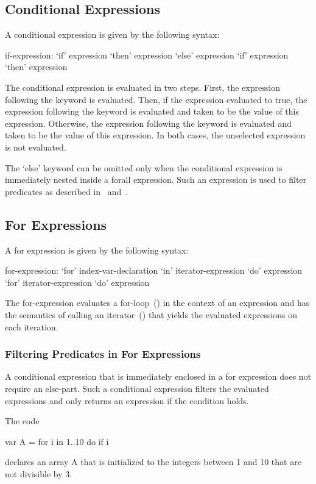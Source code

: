 \subsection{Conditional Expressions}
\label{Conditional_Expressions}

A conditional expression is given by the following syntax:
\begin{syntax}
if-expression:
  `if' expression `then' expression `else' expression
  `if' expression `then' expression
\end{syntax}
The conditional expression is evaluated in two steps.  First, the
expression following the  keyword is evaluated.  Then, if the
expression evaluated to true, the expression following the 
keyword is evaluated and taken to be the value of this expression.
Otherwise, the expression following the  keyword is
evaluated and taken to be the value of this expression.  In both
cases, the unselected expression is not evaluated.

The `else' keyword can be omitted only when the conditional expression
is immediately nested inside a forall expression.  Such an expression
is used to filter predicates as described
in~ and~.

\subsection{For Expressions}
\label{For_Expressions}

A for expression is given by the following syntax:
\begin{syntax}
for-expression:
  `for' index-var-declaration `in' iterator-expression `do' expression
  `for' iterator-expression `do' expression
\end{syntax}
The for-expression evaluates a for-loop~() in the
context of an expression and has the semantics of calling an
iterator~() that yields the evaluated expressions on
each iteration.

\subsubsection{Filtering Predicates in For Expressions}
\label{Filtering_Predicates_For}

A conditional expression that is immediately enclosed in a for
expression does not require an else-part.  Such a conditional
expression filters the evaluated expressions and only returns an
expression if the condition holds.

\begin{example}
The code
\begin{chapel}
var A = for i in 1..10 do if i %
\end{chapel}
declares an array A that is initialized to the integers between
1 and 10 that are not divisible by 3.
\end{example}
